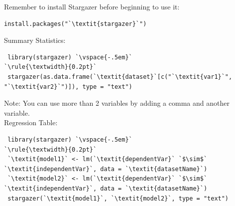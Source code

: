 \documentclass[12pt,letterpaper]{article}
\begin{document}
\begin{tcolorbox}[title = Paper-Ready Tables]
Remember to install Stargazer before beginning to use it:
\begin{lstlisting}[frameround = t t t t, backgroundcolor = \color{lightgray}]
  install.packages("`\textit{stargazer}`")
\end{lstlisting}
Summary Statistics:
\begin{lstlisting}
 library(stargazer) `\vspace{-.5em}`
`\rule{\textwidth}{0.2pt}`
 stargazer(as.data.frame(`\textit{dataset}`[c("`\textit{var1}`", "`\textit{var2}`")]), type = "text")
\end{lstlisting}
	  Note: You can use more than 2 variables by adding a comma and another variable.
\vspace{1.2em}\\
Regression Table:
\begin{lstlisting}
 library(stargazer) `\vspace{-.5em}`
`\rule{\textwidth}{0.2pt}`
 `\textit{model1}` <- lm(`\textit{dependentVar}` `$\sim$` `\textit{independentVar}`, data = `\textit{datasetName}`)
 `\textit{model2}` <- lm(`\textit{dependentVar}` `$\sim$` `\textit{independentVar}`, data = `\textit{datasetName}`)
 stargazer(`\textit{model1}`, `\textit{model2}`, type = "text")
\end{lstlisting}
\vspace{.5em} 
\end{tcolorbox}
\end{document}
